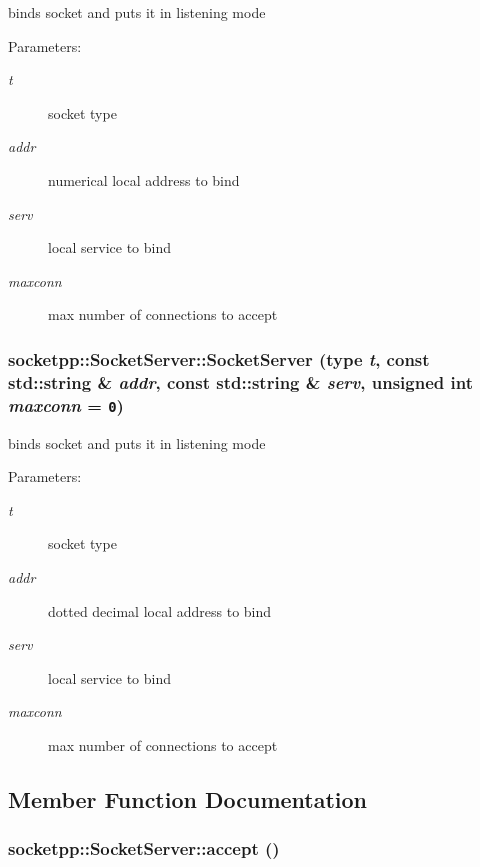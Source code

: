 binds socket and puts it in listening mode 

\begin{Desc}
\item[Parameters:]
\begin{description}
\item[{\em t}]socket type \item[{\em addr}]numerical local address to bind \item[{\em serv}]local service to bind \item[{\em maxconn}]max number of connections to accept \end{description}
\end{Desc}
\hypertarget{classsocketpp_1_1SocketServer_ed1844f6c0c6e9e3b69e69903355d171}{
\subsubsection[{SocketServer}]{\setlength{\rightskip}{0pt plus 5cm}socketpp::SocketServer::SocketServer (type {\em t}, \/  const std::string \& {\em addr}, \/  const std::string \& {\em serv}, \/  unsigned int {\em maxconn} = {\tt 0})}}
\label{classsocketpp_1_1SocketServer_ed1844f6c0c6e9e3b69e69903355d171}


binds socket and puts it in listening mode 

\begin{Desc}
\item[Parameters:]
\begin{description}
\item[{\em t}]socket type \item[{\em addr}]dotted decimal local address to bind \item[{\em serv}]local service to bind \item[{\em maxconn}]max number of connections to accept \end{description}
\end{Desc}


\subsection{Member Function Documentation}
\hypertarget{classsocketpp_1_1SocketServer_55909eb55066700b93cb8607bfb1df5b}{
\subsubsection[{accept}]{ socketpp::SocketServer::accept ()}}
\label{classsocketpp_1_1SocketServer_55909eb55066700b93cb8607bfb1df5b}



